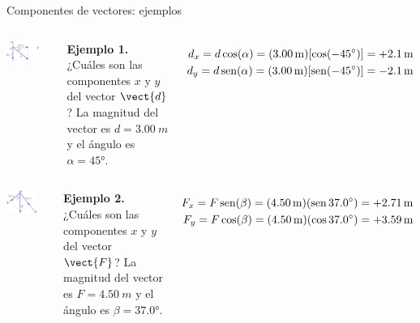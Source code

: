 \documentclass[9pt, aspectratio=169]{beamer}
\begin{document}
\begin{frame}{Componentes de vectores: ejemplos}
\begin{columns}
\begin{center}
    \includegraphics[width=0.75\textwidth]{figs/fig-05.pdf}
\end{center}
\textbf{Ejemplo 1.} ¿Cuáles son las componentes $x$ y $y$ del vector $\vect{d}$? La magnitud del vector es $d = \qty{3.00}{m}$ y el ángulo es $\alpha = \ang{45}$.
\pause

\begin{align*}
    d_x = d \cos (\alpha) = (\qty{3.00}{m}) [\cos (\ang{-45})] = + \qty{2.1}{m} \\
    d_y = d \operatorname{sen} (\alpha) = (\qty{3.00}{m}) [\operatorname{sen} (\ang{-45})] = - \qty{2.1}{m}
\end{align*}
\end{columns}
\pause

\begin{columns}
\begin{center}
    \includegraphics[width=0.75\textwidth]{figs/fig-06.pdf}
\end{center}
\textbf{Ejemplo 2.} ¿Cuáles son las componentes $x$ y $y$ del vector $\vect{F}$? La magnitud del vector es $F = \qty{4.50}{m}$ y el ángulo es $\beta = \ang{37.0}$.
\pause

\begin{align*}
    F_x = F \operatorname{sen} (\beta) = (\qty{4.50}{m}) (\operatorname{sen} \ang{37.0}) = + \qty{2.71}{m} \\
    F_y = F \cos (\beta) = (\qty{4.50}{m}) (\cos \ang{37.0}) = + \qty{3.59}{m} \\
\end{align*}
\end{columns}
\end{frame}
\end{document}
